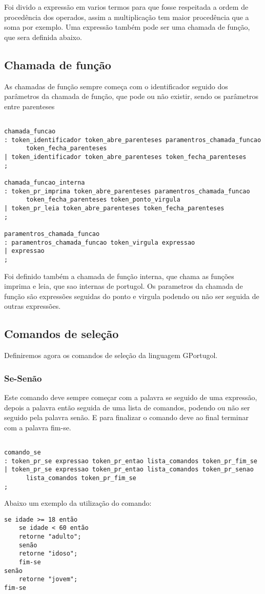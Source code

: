 \documentclass[a4paper,10pt]{article}
\begin{document}
Foi divido a expressão em varios termos para que fosse respeitada a ordem de procedência dos operados, assim a multiplicação tem maior procedência que a soma por exemplo. Uma expressão também pode ser uma chamada de função, que sera definida abaixo.


\subsection{Chamada de função}

As chamadas de função sempre começa com o identificador seguido dos parâmetros da chamada de função, que pode ou não existir, sendo os parâmetros entre parenteses

\begin{verbatim}

chamada_funcao
: token_identificador token_abre_parenteses paramentros_chamada_funcao 
      token_fecha_parenteses 
| token_identificador token_abre_parenteses token_fecha_parenteses 
;

chamada_funcao_interna
: token_pr_imprima token_abre_parenteses paramentros_chamada_funcao 
      token_fecha_parenteses token_ponto_virgula
| token_pr_leia token_abre_parenteses token_fecha_parenteses 
;

paramentros_chamada_funcao
: paramentros_chamada_funcao token_virgula expressao
| expressao
;
\end{verbatim}

Foi definido também a chamada de função interna, que chama as funções imprima e leia, que sao internas de portugol. 
Os parametros da chamada de função são expressões seguidas do ponto e virgula podendo ou não ser seguida de outras expressões.


\subsection{Comandos de seleção}

Definiremos agora os comandos de seleção da linguagem GPortugol.

\subsubsection{Se-Senão}
Este comando deve sempre começar com a palavra se seguido de uma expressão, depois a palavra então seguida de uma lista de comandos, podendo ou não ser seguido pela palavra senão. E para finalizar o comando deve ao final terminar com a palavra fim-se.	
\begin{verbatim}

comando_se
: token_pr_se expressao token_pr_entao lista_comandos token_pr_fim_se
| token_pr_se expressao token_pr_entao lista_comandos token_pr_senao 
      lista_comandos token_pr_fim_se
;

\end{verbatim}
Abaixo um exemplo da utilização do comando:
\begin{verbatim}
se idade >= 18 então
    se idade < 60 então
	retorne "adulto";
    senão
	retorne "idoso";
    fim-se
senão
    retorne "jovem";
fim-se
\end{verbatim}
\end{document}
